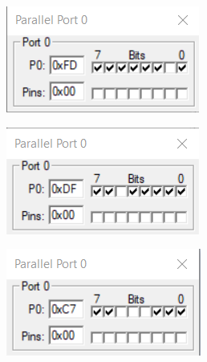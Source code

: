 \documentclass{lab_sheet}
\begin{document}
\begin{figure}[H]
\begin{subfigure}{.5\textwidth}
  \centering
  \includegraphics[frame,width=.8\linewidth]{../Figures/1_6_j.png}  
  \caption{}
  \label{fig:prob6b-a}
\end{subfigure}
\begin{subfigure}{.5\textwidth}
  \centering
  \includegraphics[frame,width=.8\linewidth]{../Figures/1_6_i.png}  
  \label{fig:prob6b-b}
  \caption{}
\end{subfigure}
\begin{subfigure}{.5\textwidth}
  \centering
    \includegraphics[frame,width=.8\linewidth]{../Figures/1_6_h.png}  
  \label{fig:prob6b-c}
  \caption{}
\end{subfigure}
\begin{subfigure}{.5\textwidth}

\end{subfigure}
\end{figure}
\end{document}
